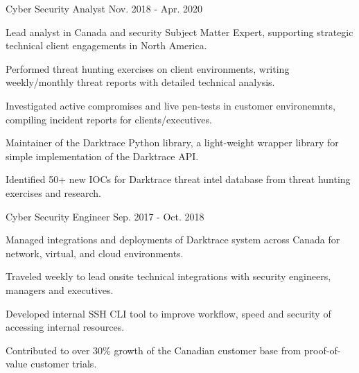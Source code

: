 \begin{cventries}
  \cventry
    {Cyber Security Analyst} %
    {} %
    {} %
    {Nov. 2018 - Apr. 2020} %
    {
      \begin{cvitems} %
        \item {Lead analyst in Canada and security Subject Matter Expert, supporting strategic technical client engagements in North America.}
        \item {Performed threat hunting exercises on client environments, writing weekly/monthly threat reports with detailed technical analysis.}
        \item {Investigated active compromises and live pen-tests in customer environemnts, compiling incident reports for clients/executives.}
        \item {Maintainer of the Darktrace Python library, a light-weight wrapper library for simple implementation of the Darktrace API.}
        \item {Identified 50+ new IOCs for Darktrace threat intel database from threat hunting exercises and research.}
      \end{cvitems}
    }

  \cventry
    {Cyber Security Engineer} %
    {} %
    {} %
    {Sep. 2017 - Oct. 2018} %
    {
      \begin{cvitems} %
        \item {Managed integrations and deployments of Darktrace system across Canada for network, virtual, and cloud environments.}
        \item {Traveled weekly to lead onsite technical integrations with security engineers, managers and executives.}
        \item {Developed internal SSH CLI tool to improve workflow, speed and security of accessing internal resources.}
        \item {Contributed to over 30\% growth of the Canadian customer base from proof-of-value customer trials.}
      \end{cvitems}
    }


\end{cventries}
